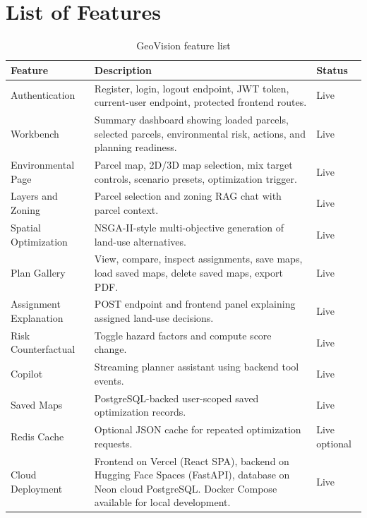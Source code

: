 \documentclass[12pt,a4paper,oneside]{report}
\begin{document}
\section{List of Features}
\begin{longtable}{p{}p{}p{}}
\caption{GeoVision feature list}\label{tab:features}\\
\toprule
Feature & Description & Status \\
\midrule
Authentication & Register, login, logout endpoint, JWT token, current-user endpoint, protected frontend routes. & Live \\
Workbench & Summary dashboard showing loaded parcels, selected parcels, environmental risk, actions, and planning readiness. & Live \\
Environmental Page & Parcel map, 2D/3D map selection, mix target controls, scenario presets, optimization trigger. & Live \\
Layers and Zoning & Parcel selection and zoning RAG chat with parcel context. & Live \\
Spatial Optimization & NSGA-II-style multi-objective generation of land-use alternatives. & Live \\
Plan Gallery & View, compare, inspect assignments, save maps, load saved maps, delete saved maps, export PDF. & Live \\
Assignment Explanation & POST endpoint and frontend panel explaining assigned land-use decisions. & Live \\
Risk Counterfactual & Toggle hazard factors and compute score change. & Live \\
Copilot & Streaming planner assistant using backend tool events. & Live \\
Saved Maps & PostgreSQL-backed user-scoped saved optimization records. & Live \\
Redis Cache & Optional JSON cache for repeated optimization requests. & Live optional \\
Cloud Deployment & Frontend on Vercel (React SPA), backend on Hugging Face Spaces (FastAPI), database on Neon cloud PostgreSQL. Docker Compose available for local development. & Live \\
\bottomrule
\end{longtable}
\end{document}
